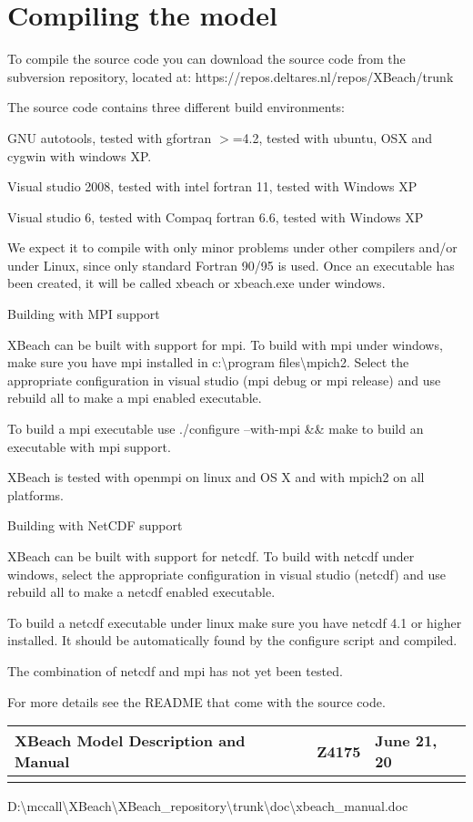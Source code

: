 \chapter{ Compiling the model}

To compile the source code you can download the source code from the subversion repository, located at: https://repos.deltares.nl/repos/XBeach/trunk

The source code contains three different build environments:

GNU autotools, tested with gfortran $>$=4.2, tested with ubuntu, OSX and cygwin with windows XP.

Visual studio 2008, tested with intel fortran 11, tested with Windows XP

Visual studio 6, tested with Compaq fortran 6.6, tested with Windows XP

We expect it to compile with only minor problems under other compilers and/or under Linux, since only standard Fortran 90/95 is used. Once an executable has been created, it will be called xbeach or xbeach.exe under windows. 

Building with MPI support

XBeach can be built with support for mpi. To build with mpi under windows, make sure you have mpi installed in c:\textbackslash program files\textbackslash mpich2. Select the appropriate configuration in visual studio (mpi debug or mpi release) and use rebuild all to make a mpi enabled executable.

To build a mpi executable use ./configure --with-mpi \&\& make to build an executable with mpi support. 

XBeach is tested with openmpi on linux and OS X and with mpich2 on all platforms.

Building with NetCDF support

XBeach can be built with support for netcdf. To build with netcdf under windows, select the appropriate configuration in visual studio (netcdf) and use rebuild all to make a netcdf enabled executable. 

To build a netcdf executable under linux make sure you have netcdf 4.1 or higher installed. It should be automatically found by the configure script and compiled. 

The combination of netcdf and mpi has not yet been tested. 

For more details see the README that come with the source code. 

\begin{tabular}{|p{1.5in}|p{1.5in}|p{1.5in}|} \hline 
XBeach Model Description and Manual & Z4175 & June 21, 20 \\ \hline 
&  &  \\ \hline 
\end{tabular}

D:\textbackslash mccall\textbackslash XBeach\textbackslash XBeach\_repository\textbackslash trunk\textbackslash doc\textbackslash xbeach\_manual.doc

